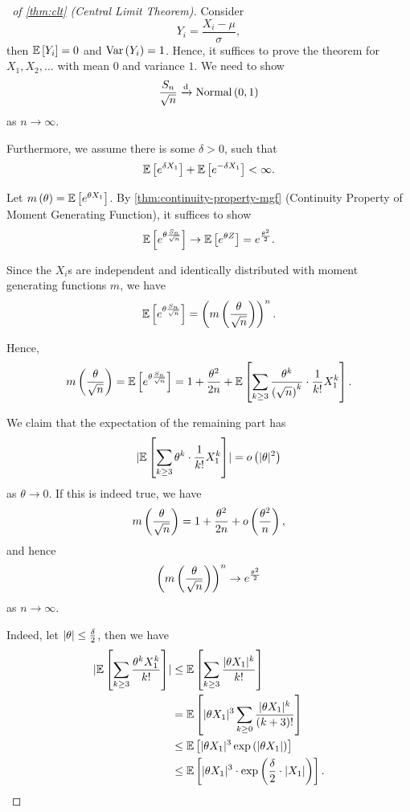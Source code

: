 \documentclass{article}
\theoremstyle{definition}
\theoremstyle{remark}
\DeclarePairedDelimiter{\abs}{\lvert}{\rvert}
\newcommand{\Expt}{\mathbb{E}}
\newcommand{\flatfrac}[2]{\frac{#1}{#2}}
\newcommand{\littleO}{o}
\newcommand{\toDist}{\xrightarrow{\mathrm{d}}}
\newcommand{\Var}{\operatorname{Var}}
\newcommand{\Normal}{\operatorname{Normal}}
\begin{document}
\begin{proof}[\proofname\ of \autoref{thm:clt} (Central Limit Theorem)]
    Consider
    \[
        Y_i = \frac{X_i - \mu}{\sigma},
    \]
    then \(\Expt\bqty{Y_i} = 0\) and \(\Var\pqty{Y_i} = 1\). Hence, it suffices to prove the theorem for \(X_1, X_2, \ldots\) with mean \(0\) and variance \(1\). We need to show
    \[
        \frac{S_n}{\sqrt{n}} \toDist \Normal\pqty{0, 1}
    \]
    as \(n \to \infty\).

    Furthermore, we assume there is some \(\delta > 0\), such that
    \[
        \Expt\bqty{e^{\delta X_1}} + \Expt\bqty{e^{- \delta X_1}} < \infty.
    \]

    Let \(m\pqty{\theta} = \Expt\bqty{e^{\theta X_1}}\). By \autoref{thm:continuity-property-mgf} (Continuity Property of Moment Generating Function), it suffices to show
    \[
        \Expt\bqty{e^{\theta \frac{S_n}{\sqrt{n}}}} \to \Expt\bqty{e^{\theta Z}} = e^{\frac{\theta^2}{2}}.
    \]

    Since the \(X_i\)s are independent and identically distributed with moment generating functions \(m\), we have
    \[
        \Expt\bqty{e^{\theta \frac{S_n}{\sqrt{n}}}} = \pqty{m\pqty{\frac{\theta}{\sqrt{n}}}}^{n}.
    \]

    Hence,
    \[
        m\pqty{\frac{\theta}{\sqrt{n}}} = \Expt\bqty{e^{\theta \frac{S_n}{\sqrt{n}}}} = 1 + \frac{\theta^2}{2n} + \Expt\bqty{\sum_{k \geq 3} \frac{\theta^k}{\pqty{\sqrt{n}}^k} \cdot \frac{1}{k!} X_1^k}.
    \]

    We claim that the expectation of the remaining part has
    \[
        \abs{\Expt\bqty{\sum_{k \geq 3} \theta^k \cdot \frac{1}{k!} X_1^k}} = \littleO\pqty{\abs{\theta}^2}
    \]
    as \(\theta \to 0\). If this is indeed true, we have
    \[
        m\pqty{\frac{\theta}{\sqrt{n}}} = 1 + \frac{\theta^2}{2n} + \littleO\pqty{\frac{\theta^2}{n}},
    \]
    and hence
    \[
        \pqty{m \pqty{\frac{\theta}{\sqrt{n}}}}^n \to e^{\flatfrac{\theta^2}{2}}
    \]
    as \(n \to \infty\).

    Indeed, let \(\abs{\theta} \leq \frac{\delta}{2}\), then we have
    \begin{align*}
        \abs{\Expt\bqty{\sum_{k \geq 3} \frac{\theta^k X_1^k}{k!}}} &\leq \Expt\bqty{\sum_{k \geq 3} \frac{\abs{\theta X_1}^k}{k!}} \\
        &= \Expt\bqty{\abs{\theta X_1}^3 \sum_{k \geq 0} \frac{\abs{\theta X_1}^k}{\pqty{k + 3}!}} \\
        &\leq \Expt\bqty{\abs{\theta X_1}^3 \exp\pqty{\abs{\theta X_1}}} \\
        &\leq \Expt\bqty{\abs{\theta X_1}^3 \cdot \exp\pqty{\frac{\delta}{2} \cdot \abs{X_1}}}.
    \end{align*}


\end{proof}
\end{document}
